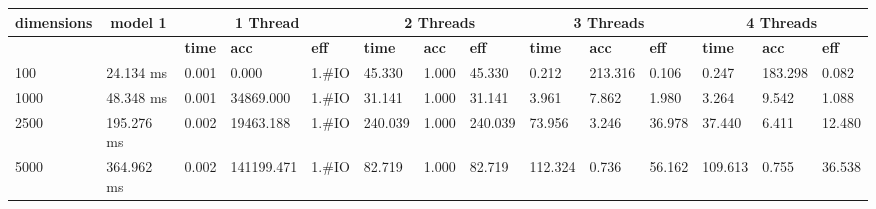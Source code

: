 \documentclass{article}
\begin{document}
\begin{table}
\begin{tabular}{|l|l|l|l|l|l|l|l|l|l|l|l|l|l|}\hline
\multicolumn{1}{|c|}{\textbf{dimensions}} &\multicolumn{1}{|c|}{\textbf{model 1}} & \multicolumn{3}{c|}{\textbf{1 Thread}} & \multicolumn{3}{c|}{\textbf{2 Threads}} & \multicolumn{3}{c|}{\textbf{3 Threads}} & \multicolumn{3}{c|}{\textbf{4 Threads}} \\ \hline
 & & \textbf{time} & \textbf{acc} & \textbf{eff} & \textbf{time} & \textbf{acc} & \textbf{eff} & \textbf{time} & \textbf{acc} & \textbf{eff} & \textbf{time} & \textbf{acc} & \textbf{eff}\\ \hline
100
 & 24.134 ms & 0.001 & 0.000 & 1.#IO & 45.330 & 1.000 & 45.330 & 0.212 & 213.316 & 0.106 & 0.247 & 183.298 & 0.082\\ \hline
1000
 & 48.348 ms & 0.001 & 34869.000 & 1.#IO & 31.141 & 1.000 & 31.141 & 3.961 & 7.862 & 1.980 & 3.264 & 9.542 & 1.088\\ \hline
2500
 & 195.276 ms & 0.002 & 19463.188 & 1.#IO & 240.039 & 1.000 & 240.039 & 73.956 & 3.246 & 36.978 & 37.440 & 6.411 & 12.480\\ \hline
5000
 & 364.962 ms & 0.002 & 141199.471 & 1.#IO & 82.719 & 1.000 & 82.719 & 112.324 & 0.736 & 56.162 & 109.613 & 0.755 & 36.538\\ \hline
\end{tabular}
\end{table}
\end{document}
